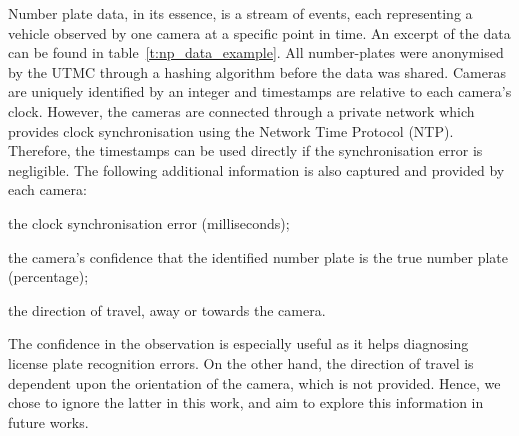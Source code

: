 Number plate data, in its essence, is a stream of events, each representing a vehicle observed by one camera at a specific point in time. An excerpt of the data can be found in table~\ref{t:np_data_example}. All number-plates were anonymised by the UTMC through a hashing algorithm before the data was shared. Cameras are uniquely identified by an integer and timestamps are relative to each camera's clock. However, the cameras are connected through a private network which provides clock synchronisation using the Network Time Protocol (NTP). Therefore, the timestamps can be used directly if the synchronisation error is negligible. The following additional information is also captured and provided by each camera:
\begin{enumerate*}[label=(\roman*)]
  \item the clock synchronisation error (milliseconds);
  \item the camera's confidence that the identified number plate is the true number plate (percentage);
  \item the direction of travel, away or towards the camera.
\end{enumerate*}
The confidence in the observation is especially useful as it helps diagnosing license plate recognition errors. On the other hand, the direction of travel is dependent upon the orientation of the camera, which is not provided. Hence, we chose to ignore the latter in this work, and aim to explore this information in future works.
